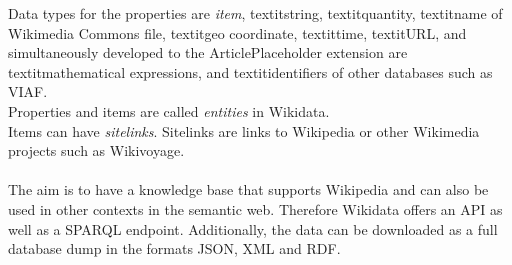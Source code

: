 Data types for the properties are \textit{item}, textit{string}, textit{quantity}, textit{name of Wikimedia Commons file}, textit{geo coordinate}, textit{time}, textit{URL}, and simultaneously developed to the ArticlePlaceholder extension are textit{mathematical expressions}, and textit{identifiers of other databases} such as VIAF. \\
Properties and items are called \textit{entities} in Wikidata. \\
Items can have \textit{sitelinks}. Sitelinks are links to Wikipedia or other Wikimedia projects such as Wikivoyage. \\
\\
The aim is to have a knowledge base that supports Wikipedia and can also be used in other contexts in the semantic web. Therefore Wikidata offers an API as well as a SPARQL endpoint. Additionally, the data can be downloaded as a full database dump in the formats JSON, XML and RDF.